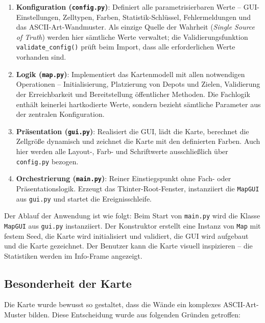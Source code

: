 \begin{enumerate}
    \item \textbf{Konfiguration (\texttt{config.py})}: Definiert alle parametrisierbaren Werte – \acs{GUI}-Einstellungen, Zelltypen, Farben, Statistik-Schlüssel, Fehlermeldungen und das \acs{ASCII}-Art-Wandmuster. Als einzige Quelle der Wahrheit (\textit{Single Source of Truth}) werden hier sämtliche Werte verwaltet; die Validierungsfunktion \texttt{validate\_config()} prüft beim Import, dass alle erforderlichen Werte vorhanden sind.
    \item \textbf{Logik (\texttt{map.py})}: Implementiert das Kartenmodell mit allen notwendigen Operationen – Initialisierung, Platzierung von Depots und Zielen, Validierung der Erreichbarkeit und Bereitstellung öffentlicher Methoden. Die Fachlogik enthält keinerlei hartkodierte Werte, sondern bezieht sämtliche Parameter aus der zentralen Konfiguration.
    \item \textbf{Präsentation (\texttt{gui.py})}: Realisiert die \acs{GUI}, lädt die Karte, berechnet die Zellgröße dynamisch und zeichnet die Karte mit den definierten Farben. Auch hier werden alle Layout-, Farb- und Schriftwerte ausschließlich über \texttt{config.py} bezogen.
    \item \textbf{Orchestrierung (\texttt{main.py})}: Reiner Einstiegspunkt ohne Fach- oder Präsentationslogik. Erzeugt das Tkinter-Root-Fenster, instanziiert die \texttt{MapGUI} aus \texttt{gui.py} und startet die Ereignisschleife.
\end{enumerate}

Der Ablauf der Anwendung ist wie folgt: Beim Start von \texttt{main.py} wird die Klasse \texttt{MapGUI} aus \texttt{gui.py} instanziiert. Der Konstruktor erstellt eine Instanz von \texttt{Map} mit festem Seed, die Karte wird initialisiert und validiert, die \acs{GUI} wird aufgebaut und die Karte gezeichnet. Der Benutzer kann die Karte visuell inspizieren – die Statistiken werden im Info-Frame angezeigt.


\subsection{Besonderheit der Karte}

Die Karte wurde bewusst so gestaltet, dass die Wände ein komplexes \acs{ASCII}-Art-Muster bilden. Diese Entscheidung wurde aus folgenden Gründen getroffen:

